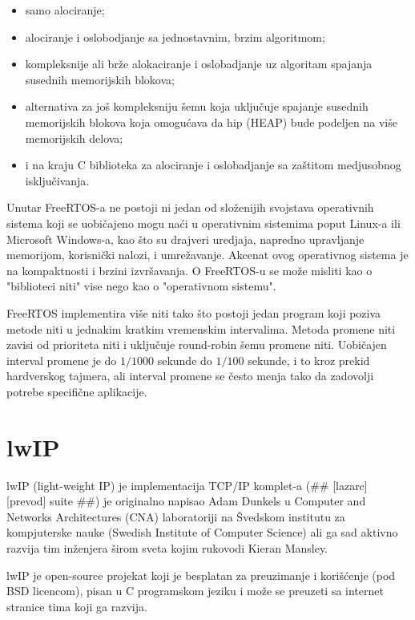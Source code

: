 \documentclass[a4paper,12pt, master]{etf}
\begin{document}
	\begin{itemize}
		\item samo alociranje;
		\item alociranje i oslobodjanje sa jednostavnim, brzim algoritmom;
		\item kompleksnije ali br\v{z}e alokaciranje i oslobadjanje uz algoritam spajanja susednih
		memorijskih blokova;
		\item alternativa za jo\v{s} kompleksniju \v{s}emu koja uklju\v{c}uje spajanje susednih
		memorijskih	blokova	koja omogu\'{c}ava da hip (HEAP) bude podeljen na vi\v{s}e memorijskih
		delova;
		\item i na kraju C biblioteka za alociranje i oslobadjanje sa za\v{s}titom medjusobnog
		isklju\v{c}ivanja.
	\end{itemize}

	Unutar FreeRTOS-a ne postoji ni jedan od slo\v{z}enijih svojstava operativnih sistema koji se
	uobi\v{c}ajeno mogu na\'{c}i u operativnim sistemima poput Linux-a ili Microsoft Windows-a, kao
	\v{s}to su drajveri uredjaja, napredno upravljanje memorijom, korisni\v{c}ki nalozi, i
	umre\v{z}avanje. Akcenat ovog operativnog sistema je na kompaktnosti i brzini izvr\v{s}avanja. O
	FreeRTOS-u se mo\v{z}e misliti kao o "biblioteci niti" vise nego kao o "operativnom sistemu".

	FreeRTOS implementira vi\v{s}e niti tako \v{s}to postoji jedan program koji poziva metode niti u
	jednakim kratkim vremenskim intervalima. Metoda promene niti zavisi od prioriteta niti i
	uklju\v{c}uje round-robin \v{s}emu promene niti. Uobi\v{c}ajen interval promene je do $1/1000$ sekunde
	do $1/100$ sekunde, i to kroz prekid hardverskog tajmera, ali interval promene se \v{c}esto menja
	tako da zadovolji potrebe specifi\v{c}ne aplikacije.

	\section{lwIP}

	lwIP (light-weight IP) je implementacija TCP/IP komplet-a (\#\# [lazarc] [prevod] suite
	\#\#) je originalno napisao Adam Dunkels u Computer and Networks Architectures (CNA)
	laboratoriji na	\v{S}vedskom institutu za kompjuterske nauke (Swedish Institute of Computer
	Science) ali ga sad	aktivno razvija tim in\v{z}enjera \v{s}irom sveta kojim rukovodi Kieran
	Mansley\@.

	lwIP je open-source projekat koji je besplatan za preuzimanje i kori\v{s}\'{c}enje (pod BSD
	licencom), pisan u C programskom jeziku i mo\v{z}e se preuzeti sa internet stranice tima koji
	ga razvija.
\end{document}
